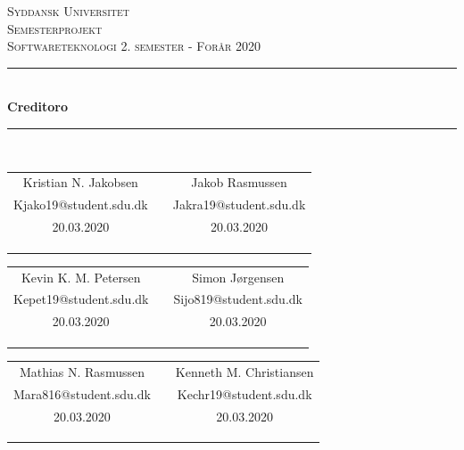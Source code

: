 \begin{titlepage}
\begin{center}
\textsc{\LARGE Syddansk Universitet }\\[0.8cm]

\textsc{Semesterprojekt}\\[0.5cm]

\textsc{\large Softwareteknologi 2. semester - Forår 2020}\\[0.5cm]
\rule{\linewidth}{0.5mm}\\[0.4cm]
{ \LARGE \bfseries Creditoro \\[0.4cm]}
\rule{\linewidth}{0.5mm}\\[1.2cm]

\begin{tabular}{c c c}
	Kristian N. Jakobsen     &   & Jakob Rasmussen\\ 
	Kjako19@student.sdu.dk   &   & Jakra19@student.sdu.dk \\
	20.03.2020               &   & 20.03.2020 \\
    \\ \\
        	\cline{1-1}\cline{3-3}

        	\\
\end{tabular}
\begin{tabular}{c c c} 
	Kevin K. M. Petersen     &   & Simon Jørgensen \\ 
	Kepet19@student.sdu.dk   &   & Sijo819@student.sdu.dk\\
	20.03.2020               &   & 20.03.2020\\
    \\ \\
        	\cline{1-1}\cline{3-3}

        	\\
\end{tabular}
\begin{tabular}{c c c} 
	Mathias N. Rasmussen     &   & Kenneth M. Christiansen\\ 
	Mara816@student.sdu.dk   &   & Kechr19@student.sdu.dk \\
	20.03.2020               &   & 20.03.2020 \\
    \\ \\
        	\cline{1-1}\cline{3-3}

        	\\
\end{tabular}


\end{center}
\end{titlepage}
